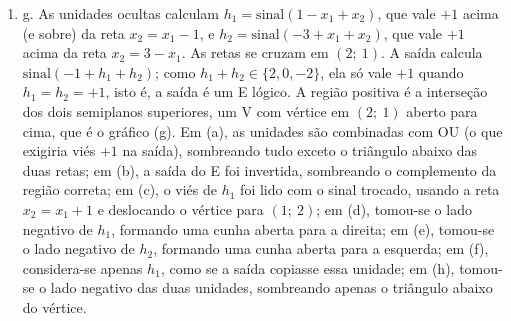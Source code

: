 \documentclass{dlproblemset}
\begin{document}
\begin{enumerate}[1)]
    \item g. As unidades ocultas calculam $h_1 = \mathrm{sinal}(1 - x_1 + x_2)$, que vale $+1$ acima (e sobre) da reta $x_2 = x_1 - 1$, e $h_2 = \mathrm{sinal}(-3 + x_1 + x_2)$, que vale $+1$ acima da reta $x_2 = 3 - x_1$. As retas se cruzam em $(2;\ 1)$. A saída calcula $\mathrm{sinal}(-1 + h_1 + h_2)$; como $h_1 + h_2 \in \{2, 0, -2\}$, ela só vale $+1$ quando $h_1 = h_2 = +1$, isto é, a saída é um E lógico. A região positiva é a interseção dos dois semiplanos superiores, um V com vértice em $(2;\ 1)$ aberto para cima, que é o gráfico (g). Em (a), as unidades são combinadas com OU (o que exigiria viés $+1$ na saída), sombreando tudo exceto o triângulo abaixo das duas retas; em (b), a saída do E foi invertida, sombreando o complemento da região correta; em (c), o viés de $h_1$ foi lido com o sinal trocado, usando a reta $x_2 = x_1 + 1$ e deslocando o vértice para $(1;\ 2)$; em (d), tomou-se o lado negativo de $h_1$, formando uma cunha aberta para a direita; em (e), tomou-se o lado negativo de $h_2$, formando uma cunha aberta para a esquerda; em (f), considera-se apenas $h_1$, como se a saída copiasse essa unidade; em (h), tomou-se o lado negativo das duas unidades, sombreando apenas o triângulo abaixo do vértice.
\end{enumerate}
\end{document}
